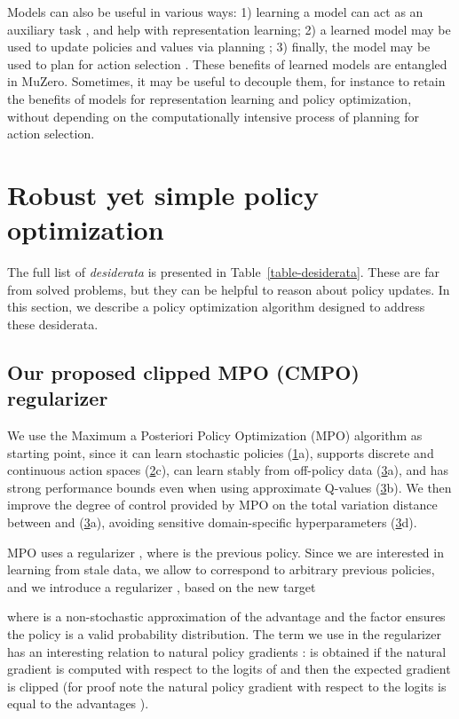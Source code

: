 \documentclass{article}
\newcommand{\desireObservability}[1]{(\hyperref[table-desiderata]{1}#1)}
\newcommand{\desirePolicy}[1]{(\hyperref[table-desiderata]{2}#1)}
\newcommand{\desireRobust}[1]{(\hyperref[table-desiderata]{3}#1)}
\begin{document}
Models can also be useful in various ways: 1) learning a model can act as an auxiliary task \citep{schmidhuber90,sutton2011horde,jaderberg2016reinforcement, guez_hindsight}, and help with representation learning; 2) a learned model may be used to update policies and values via planning \citep{werbos87,sutton1990dyna,Ha2018}; 3) finally, the model may be used to plan for action selection \citep{richalet1978,silver2010}. These benefits of learned models are entangled in MuZero. Sometimes, it may be useful to decouple them, for instance to retain the benefits of models for representation learning and policy optimization, without depending on the computationally intensive process of planning for action selection.

\section{Robust yet simple policy optimization}\label{method}

The full list of \emph{desiderata} is presented in Table~\ref{table-desiderata}. These are far from solved problems, but they can be helpful to reason about policy updates. In this section, we describe a policy optimization algorithm designed to address these desiderata.

\subsection{Our proposed clipped MPO (CMPO) regularizer}\label{CMPO}

We use the Maximum a Posteriori Policy Optimization (MPO) algorithm  \citep{abdolmaleki2018maximum} as starting point, since it can learn stochastic policies \desireObservability{a}, supports discrete and continuous action spaces \desirePolicy{c}, can learn stably from off-policy data \desireRobust{a}, and has strong performance bounds even when using approximate Q-values  \desireRobust{b}. We then improve the degree of control provided by MPO on the total variation distance between  and  \desireRobust{a}, avoiding sensitive domain-specific hyperparameters \desireRobust{d}.

MPO uses a regularizer , where  is the previous policy. Since we are interested in learning from stale data, we allow  to correspond to arbitrary previous policies, and we introduce a regularizer , based on the new target  

where  is a non-stochastic approximation of the advantage  and the factor  ensures the policy is a valid probability distribution. The  term we use in the regularizer has an interesting relation to natural policy gradients \citep{kakade2001natural}:  is obtained if the natural gradient is computed with respect to the logits of  and then the expected gradient is clipped (for proof note the natural policy gradient with respect to the logits is equal to the advantages \citep{agarwal2019optimality}).
\end{document}
